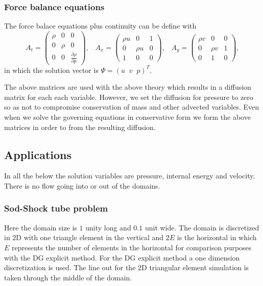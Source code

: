 \subsubsection{Force balance equations}
\label{NS}
The force balace equations plus continuity can be define
with
\begin{equation}
A_t=
  \begin{pmatrix}
\rho  &  0     & 0\\
0     &  \rho  & 0 \\
0     &  0     & \frac{\partial \rho}{\partial p}
  \end{pmatrix}, \;\;\;
A_x=
  \begin{pmatrix}
\rho u &  0  &  1\\
0     &  \rho u & 0 \\
1     &  0  & 0
  \end{pmatrix}, \;\;\;
A_y=
  \begin{pmatrix}
\rho v &  0  &  0  \\
0     &  \rho v &  1 \\
0     &  1      &  0
  \end{pmatrix},
\label{A-matrix}
\end{equation}
in which the solution vector is $\Psi=(u \;\; v \;\; p)^T$.

The above matrices are used with the above theory
which results in a diffusion matrix for each each variable.
However, we set the diffusion for pressure to zero so
as not to compromise conservation of mass and other advected variables.
Even when we solve the governing equations in conservative form
we form the above matrices in order to from the resulting diffusion.






\subsection{Applications}
\label{Applications-comp}

In all the below the solution variables are
pressure, internal energy and velocity.
There is no flow going into or out of the domains.

\subsubsection{Sod-Shock tube problem}
Here the domain size is $1$ unity long and $0.1$ unit wide.
The domain is discretized in 2D with one triangle element in
the vertical and $2E$ is the horizontal in which
$E$ represents the number of elements in the horizontal
for comparison purposes with the DG explicit method.
For the DG explicit method a one dimension discretization is used.
The line out for the 2D triangular element simulation is
taken through the middle of the domain.

